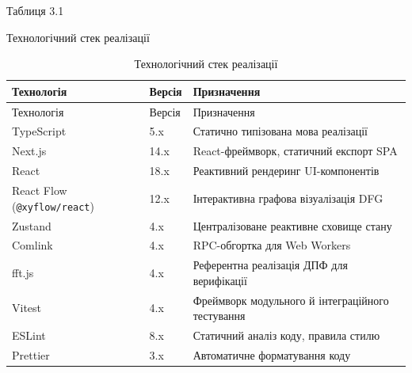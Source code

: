 \documentclass[
]{article}
\newcommand{\passthrough}[1]{#1}
\begin{document}
Таблиця 3.1

Технологічний стек реалізації

\begin{longtable}[]{@{}
  >{\raggedright\arraybackslash}p{}
  >{\raggedright\arraybackslash}p{}
  >{\raggedright\arraybackslash}p{}@{}}
\caption[Технологічний стек реалізації]{Технологічний стек
реалізації}\tabularnewline
\toprule\noalign{}
\begin{minipage}[b]{\linewidth}\raggedright
Технологія
\end{minipage} & \begin{minipage}[b]{\linewidth}\raggedright
Версія
\end{minipage} & \begin{minipage}[b]{\linewidth}\raggedright
Призначення
\end{minipage} \\
\midrule\noalign{}
\endfirsthead
\toprule\noalign{}
\begin{minipage}[b]{\linewidth}\raggedright
Технологія
\end{minipage} & \begin{minipage}[b]{\linewidth}\raggedright
Версія
\end{minipage} & \begin{minipage}[b]{\linewidth}\raggedright
Призначення
\end{minipage} \\
\midrule\noalign{}
\endhead
\bottomrule\noalign{}
\endlastfoot
TypeScript & 5.x & Статично типізована мова реалізації \\
Next.js & 14.x & React-фреймворк, статичний експорт SPA \\
React & 18.x & Реактивний рендеринг UI-компонентів \\
React Flow (\passthrough{\lstinline!@xyflow/react!}) & 12.x &
Інтерактивна графова візуалізація DFG \\
Zustand & 4.x & Централізоване реактивне сховище стану \\
Comlink & 4.x & RPC-обгортка для Web Workers \\
fft.js & 4.x & Референтна реалізація ДПФ для верифікації \\
Vitest & 4.x & Фреймворк модульного й інтеграційного тестування \\
ESLint & 8.x & Статичний аналіз коду, правила стилю \\
Prettier & 3.x & Автоматичне форматування коду \\
\end{longtable}
\end{document}
